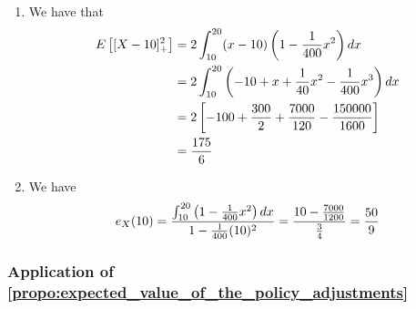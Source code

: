 \documentclass[notoc,notitlepage]{tufte-book}
\begin{document}
\begin{solution}
\begin{enumerate}
    \item We have that
      \begin{align*}
        E \left[ [ X - 10 ]_+^2 \right] &= 2 \int_{10}^{20} ( x - 10 ) \left( 1 - \frac{1}{400}x^2 \right) \mathop{}\!d{x} \\
                                        &= 2 \int_{10}^{20} \left( -10 + x + \frac{1}{40} x^2 - \frac{1}{400} x^3 \right) \mathop{}\!d{x} \\
                                        &= 2 \left[ -100 + \frac{300}{2} + \frac{7000}{120} - \frac{150000}{1600} \right] \\
                                        &= \frac{175}{6}
      \end{align*}

    \item We have
      \begin{equation*}
        e_X(10) = \frac{\int_{10}^{20} \left( 1 - \frac{1}{400} x^2 \right) \mathop{}\!d{x}}{1 - \frac{1}{400} (10)^2} = \frac{10 - \frac{7000}{1200}}{\frac{3}{4}} = \frac{50}{9}
      \end{equation*}
  \end{enumerate}
\end{solution}

\subsubsection{Application of \cref{propo:expected_value_of_the_policy_adjustments}}%
\label{ssub:application_of_expected_value_of_the_policy_adjustments}
\end{document}
